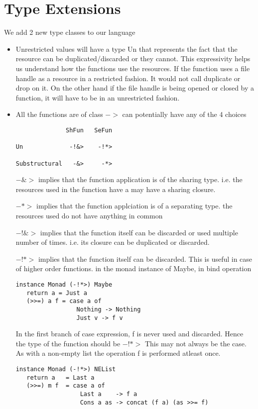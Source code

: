 \chapter{Type Extensions}

We add 2 new type classes to our language
\begin{itemize}
\item Unrestricted values will have a type Un
  that represents the fact that the resource can be
  duplicated/discarded or they cannot.
  This expressivity helps us understand how the functions
  use the resources. If the function uses a file handle as a resource
  in a restricted fashion. It would not call duplicate or drop on it.
  On the other hand if the file handle is being opened or closed
  by a function, it will have to be in an unrestricted fashion.
\item All the functions are of class $->$ can potentially have any of the 4 choices
\begin{verbatim}
              ShFun   SeFun

Un             -!&>    -!*>

Substructural   -&>     -*>
\end{verbatim}
  $-\&>$ implies that the function application is of the sharing type.
  i.e. the resources used in the function have a may have a sharing closure.

  $-*>$ implies that the function applciation is of a separating type.
  the resources used do not have anything in common

  $-!\&>$ implies that the function itself can be discarded
  or used multiple number of times. i.e. its closure
  can be duplicated or discarded.

  $-!*>$ implies that the function itself can be discarded.
  This is useful in case of higher order functions. in the monad instance
  of Maybe, in bind operation

\begin{lstlisting}
instance Monad (-!*>) Maybe
   return a = Just a
   (>>=) a f = case a of
                 Nothing -> Nothing
                 Just v -> f v
\end{lstlisting}

  In the first branch of case expression, f is never used and discarded. Hence
  the type of the function should be $-!*>$
  This may not always be the case. As with a non-empty list
  the operation f is performed atleast once.

\begin{lstlisting}
instance Monad (-!*>) NEList
   return a   = Last a
   (>>=) m f  = case a of
                  Last a    -> f a
                  Cons a as -> concat (f a) (as >>= f)
\end{lstlisting}

\end{itemize}


